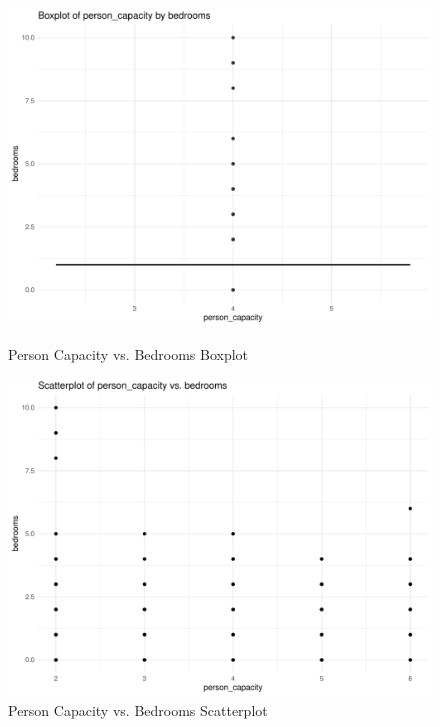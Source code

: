 \documentclass[12pt, letterpaper]{article}
\begin{document}
\begin{figure}[H]
  \begin{minipage}{0.45\textwidth}
    \includegraphics[width=\linewidth]{person_capacity_bedrooms__boxplot.pdf}
    \caption{Person Capacity vs. Bedrooms Boxplot}
    \label{fig:person_capacity_bedrooms__boxplot}
  \end{minipage}
  \hspace{0.05\textwidth}
  \begin{minipage}{0.45\textwidth}
    \includegraphics[width=\linewidth]{person_capacity_bedrooms__scatterplot.pdf}
    \caption{Person Capacity vs. Bedrooms Scatterplot}
    \label{fig:person_capacity_bedrooms__scatterplot}
  \end{minipage}


\end{figure}
\end{document}
